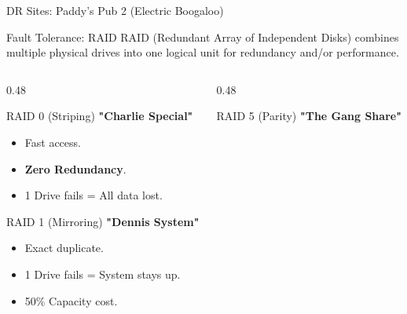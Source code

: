 \documentclass[aspectratio=169]{beamer}  %
\begin{document}
\begin{frame}{DR Sites: Paddy's Pub 2 (Electric Boogaloo)}
\begin{center}
    \end{center}
\end{frame}

\begin{frame}{Fault Tolerance: RAID}
    RAID (Redundant Array of Independent Disks) combines multiple physical drives into one logical unit for redundancy and/or performance.
    \begin{columns}[T]
        \begin{column}{0.48\textwidth}
            \begin{block}{RAID 0 (Striping)}
                \scriptsize
                \textbf{"Charlie Special"}
                \begin{itemize}
                    \item Fast access.
                    \item \textbf{Zero Redundancy}.
                    \item 1 Drive fails = All data lost.
                \end{itemize}
            \end{block}
            \begin{block}{RAID 1 (Mirroring)}
                \scriptsize
                \textbf{"Dennis System"}
                \begin{itemize}
                    \item Exact duplicate.
                    \item 1 Drive fails = System stays up.
                    \item 50\% Capacity cost.
                \end{itemize}
            \end{block}
        \end{column}
        \begin{column}{0.48\textwidth}
            \begin{block}{RAID 5 (Parity)}
                \scriptsize
                \textbf{"The Gang Share"}

\end{block}
\end{column}
\end{columns}
\end{frame}
\end{document}

